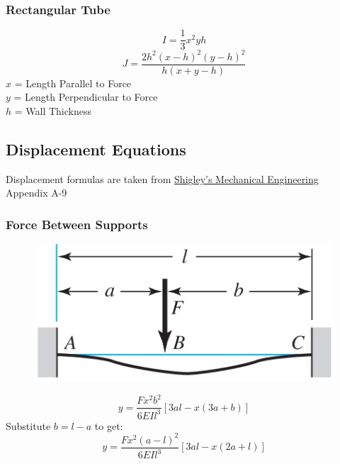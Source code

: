 \documentclass[11pt,a4paper,titlepage]{article}
\begin{document}
	\subsubsection{Rectangular Tube}
	\begin{equation}
		I = \frac{1}{3} x^2 y h
	\end{equation}
	\begin{equation}
		J = \frac{2 h^2 (x-h)^2 (y-h)^2}{h (x + y - h)}
	\end{equation}
	$x$ = Length Parallel to Force \\
	$y$ = Length Perpendicular to Force \\
	$h$ = Wall Thickness
	
	\subsection{Displacement Equations}
	Displacement formulas are taken from \href{https://fac.ksu.edu.sa/sites/default/files/mechanical-disgin-shigley.pdf}{Shigley's Mechanical Engineering} Appendix A-9
	\subsubsection{Force Between Supports}
	\begin{figure}[H]
		\centering
		\includegraphics[width=0.7\linewidth]{"Force_Btwn_Supports"}
	\end{figure}
	
	\begin{equation}
		y = \frac{F x^2 b^2}{6 EI l^3} [3al-x(3a+b)]
	\end{equation}
	Substitute $b=l-a$ to get:
	\begin{equation} \label{btwn_y}
		y = \frac{F x^2 (a-l)^2}{6 EI l^3} [3al-x(2a+l)]
	\end{equation}
	
\end{document}

